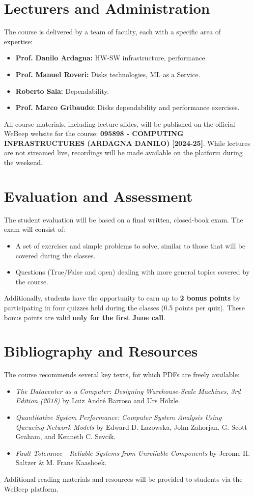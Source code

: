 \section{Lecturers and Administration}

The course is delivered by a team of faculty, each with a specific area of expertise:
\begin{itemize}
    \item \textbf{Prof. Danilo Ardagna:} HW-SW infrastructure, performance.
    \item \textbf{Prof. Manuel Roveri:} Disks technologies, ML as a Service.
    \item \textbf{Roberto Sala:} Dependability.
    \item \textbf{Prof. Marco Gribaudo:} Disks dependability and performance exercises.
\end{itemize}

All course materials, including lecture slides, will be published on the official WeBeep website for the course: \textbf{095898 - COMPUTING INFRASTRUCTURES (ARDAGNA DANILO) [2024-25]}. While lectures are not streamed live, recordings will be made available on the platform during the weekend.

\section{Evaluation and Assessment}

The student evaluation will be based on a final written, closed-book exam. The exam will consist of:
\begin{itemize}
    \item A set of exercises and simple problems to solve, similar to those that will be covered during the classes.
    \item Questions (True/False and open) dealing with more general topics covered by the course.
\end{itemize}
Additionally, students have the opportunity to earn up to \textbf{2 bonus points} by participating in four quizzes held during the classes (0.5 points per quiz). These bonus points are valid \textbf{only for the first June call}.

\section{Bibliography and Resources}

The course recommends several key texts, for which PDFs are freely available:
\begin{itemize}
    \item \textit{The Datacenter as a Computer: Designing Warehouse-Scale Machines, 3rd Edition (2018)} by Luiz André Barroso and Urs Hölzle.
    \item \textit{Quantitative System Performance: Computer System Analysis Using Queueing Network Models} by Edward D. Lazowska, John Zahorjan, G. Scott Graham, and Kenneth C. Sevcik.
    \item \textit{Fault Tolerance - Reliable Systems from Unreliable Components} by Jerome H. Saltzer \& M. Frans Kaashoek.
\end{itemize}
Additional reading materials and resources will be provided to students via the WeBeep platform.
